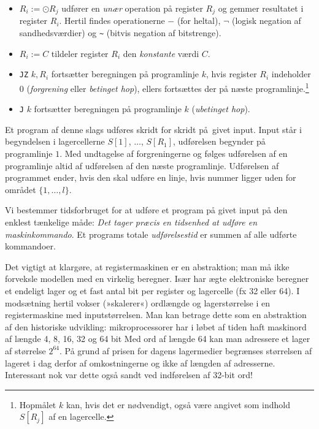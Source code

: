 \begin{itemize}
  \item $R_i:=\odot R_j$ udfører en \emph{unær} operation
    på register $R_j$ og gemmer resultatet i register $R_i$.
    Hertil findes operationerne $-$ (for heltal), $\neg$ (logisk negation af sandhedsværdier) og \texttt{\~} (bitvis negation af bitstrenge).
  \item $R_i:= C$ tildeler register $R_i$ den \emph{konstante}
    værdi $C$.
  \item  \texttt{JZ} $k, R_i$ fortsætter beregningen på programlinje $k$, hvis register $R_i$ indeholder $0$ (\emph{forgrening}
    eller \emph{betinget hop}),
    ellers fortsættes der på næste programlinje.\footnote{%
      Hopmålet $k$ kan, hvis det er nødvendigt, også være angivet som indhold $S[R_j]$ af en lagercelle.}
    \item \texttt{J} $k$ fortsætter beregningen på programlinje $k$ (\emph{ubetinget hop}).
\end{itemize}

Et program af denne slags udføres skridt for skridt på givet input.
Input står i begyndelsen i lagercellerne $S[1]$, $\ldots$, $S[R_1]$, udførelsen begynder på programlinje $1$.
Med undtagelse af forgreningerne  og  følges udførelsen af en programlinje altid af udførelsen af den næste programlinje.
Udførelsen af programmet ender, hvis den skal udføre en linje, hvis nummer ligger uden for området $\{1,\ldots,l\}$.

Vi bestemmer tidsforbruget for at udføre et program på givet input på den enklest tænkelige måde:
\emph{Det tager præcis en tidsenhed at udføre en maskinkommando}.
Et programs totale \emph{udførelsestid} 
er summen af alle udførte kommandoer.

Det vigtigt at klargøre, at registermaskinen er en abstraktion; man må ikke forveksle modellen med en virkelig beregner.
Især har ægte elektroniske beregner
et endeligt lager og et fast antal bit per register og lagercelle (fx 32 eller 64).
I modsætning hertil vokser (»skalerer«) ordlængde og lagerstørrelse i en registermaskine med inputstørrelsen.
Man kan betrage dette som en abstraktion af den historiske udvikling: 
mikroprocessorer har i løbet af tiden haft maskinord af længde 4, 8, 16, 32 og 64 bit
Med ord af længde 64 kan man adressere et lager af størrelse $2^{64}$.
På grund af prisen for dagens lagermedier begrænses størrelsen af lageret i dag derfor af omkostningerne og ikke af længden af adresserne.
Interessant nok var dette også sandt ved indførelsen af 32-bit ord!

